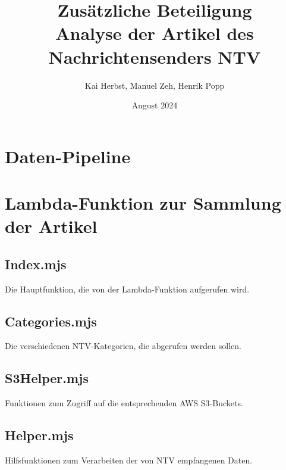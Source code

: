 \documentclass[12pt]{article}
\title{%
    \textbf{Zusätzliche Beteiligung}\\
    \bigskip
    \large Analyse der Artikel des Nachrichtensenders NTV
}
\author{Kai Herbst, Manuel Zeh, Henrik Popp}
\date{August 2024}
\begin{document}
\begin{sloppypar}
	\maketitle
	\thispagestyle{empty}

	\newpage
	\setcounter{page}{1}

	\renewcommand{\contentsname}{Inhaltsverzeichnis}
	\tableofcontents

	\newpage
	\setcounter{page}{1}

	\section{Daten-Pipeline}



	\appendix
	\section{Lambda-Funktion zur Sammlung der Artikel}

	\subsection{Index.mjs}

	Die Hauptfunktion, die von der Lambda-Funktion aufgerufen wird.

	

	\newpage
	\subsection{Categories.mjs}

	Die verschiedenen NTV-Kategorien, die abgerufen werden sollen.

	

	\newpage
	\subsection{S3Helper.mjs}

	Funktionen zum Zugriff auf die entsprechenden AWS S3-Buckets.

	

	\newpage
	\subsection{Helper.mjs}

	Hilfsfunktionen zum Verarbeiten der von NTV empfangenen Daten.

	



\end{sloppypar}
\end{document}
